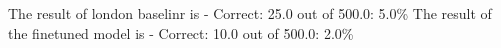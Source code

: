 The result of london baselinr is - \newline
Correct: 25.0 out of 500.0: 5.0\%  \newline
The result of the finetuned model is - \newline
Correct: 10.0 out of 500.0: 2.0\% \newline
